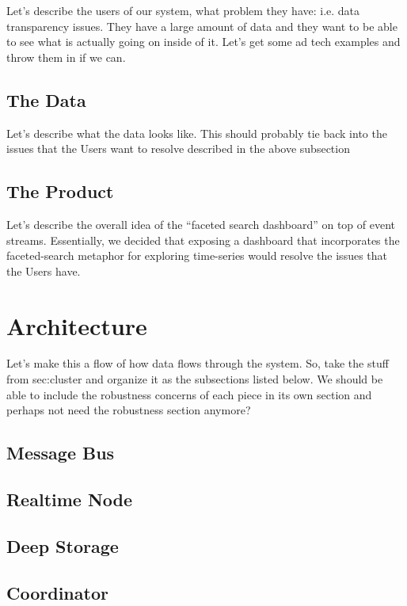 \documentclass{vldb}
\begin{document}
Let's describe the users of our system, what problem they have: i.e. data transparency issues.  They have a large amount of data and they want to be able to see what is actually going on inside of it.  Let's get some ad tech examples and throw them in if we can.

\subsection{The Data}

Let's describe what the data looks like.  This should probably tie back into the issues that the Users want to resolve described in the above subsection

\subsection{The Product}

Let's describe the overall idea of the ``faceted search dashboard'' on top of event streams.  Essentially, we decided that exposing a dashboard that incorporates the faceted-search metaphor for exploring time-series would resolve the issues that the Users have.

\section{Architecture}
\label{sec:architecture}

Let's make this a flow of how data flows through the system.  So, take the stuff from sec:cluster and organize it as the subsections listed below.  We should be able to include the robustness concerns of each piece in its own section and perhaps not need the robustness section anymore?

\subsection{Message Bus}

\subsection{Realtime Node}

\subsection{Deep Storage}

\subsection{Coordinator}
\end{document}
